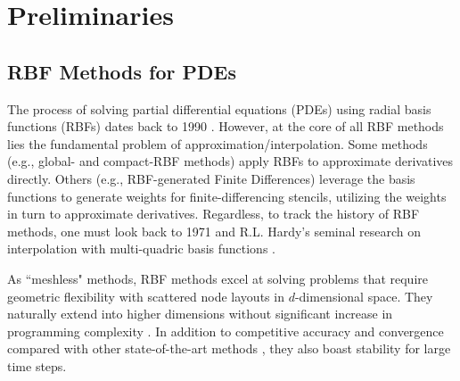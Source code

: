 \documentclass[11pt]{report}
\begin{document}
\tableofcontents
\fi

{ \graphicspath{{rbffd_methods_content/}} 




\part{Preliminaries}


\chapter{RBF Methods for PDEs}

The process of solving partial differential equations (PDEs) using radial basis functions (RBFs) dates back to 1990 \cite{Kansa1990a,Kansa1990b}. However, at the core of all RBF methods lies the fundamental problem of approximation/interpolation. Some methods (e.g., global- and compact-RBF methods) apply RBFs to approximate derivatives directly. Others (e.g., RBF-generated Finite Differences) leverage the basis functions to generate weights for finite-differencing stencils, utilizing the weights in turn to approximate derivatives. Regardless, to track the history of RBF methods, one must look back to 1971 and R.L. Hardy's seminal research on interpolation with multi-quadric basis functions \cite{Hardy1971}. 

As ``meshless" methods, RBF methods excel at solving problems that require geometric flexibility with scattered node layouts in $d$-dimensional space. They naturally extend into higher dimensions without significant increase in programming complexity \cite{FlyerWright07,WrightFlyerYuen10}. In addition to competitive accuracy and convergence compared with other state-of-the-art methods \cite{FlyerWright07, FlyerWright09, FlyerLehto10, WrightFlyerYuen10, FlyerFornberg11}, they also boast stability for large time steps.

}
\end{document}
